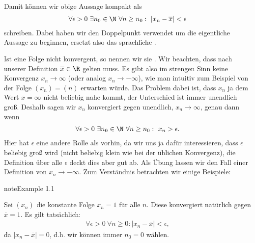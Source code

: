 \documentclass[letterpaper,10pt,english]{jupyterBook}
\begin{document}
Damit können wir obige Aussage kompakt als
\begin{equation*}
\begin{split}\forall \epsilon > 0 ~\exists n_0 \in \N ~\forall n \geq n_0: ~\vert x_n - \overline{x} \vert < \epsilon\end{split}
\end{equation*}
schreiben. Dabei haben wir den Doppelpunkt verwendet um die eigentliche Aussage zu beginnen, \sphinxstyleemphasis{:} ersetzt also das sprachliche .

Ist eine Folge nicht konvergent, so nennen wir sie . Wir beachten, dass nach unserer Definition \(\overline{x} \in \R\) gelten muss. Es gibt also im strengen Sinn keine Konvergenz \(x_n \rightarrow \infty\) (oder analog \(x_n \rightarrow -\infty\)), wie man intuitiv zum Beispiel von der Folge \((x_n) = (n)\) erwarten würde. Das Problem dabei ist, dass \(x_n\) ja dem Wert \(\overline{x}=\infty\) nicht beliebig nahe kommt, der Unterschied ist immer unendlich groß. Deshalb sagen wir \(x_n\) konvergiert gegen unendlich, \(x_n \rightarrow \infty\), genau dann wenn
\begin{equation*}
\begin{split} \forall \epsilon > 0 ~\exists n_0 \in \N ~\forall n \geq n_0: ~ x_n > \epsilon .\end{split}
\end{equation*}
Hier hat \(\epsilon\) eine andere Rolle als vorhin, da wir uns ja dafür interessieren, dass \(\epsilon\) beliebig groß wird (nicht beliebig klein wie bei der üblichen Konvergenz), die Definition über alle \(\epsilon\) deckt dies aber gut ab. Als Übung lassen wir den Fall einer Definition von \(x_n \rightarrow -  \infty\). Zum Verständnis betrachten wir einige Beispiele:
\label{vorkurs/folgen:example-1}
\begin{sphinxadmonition}{note}{Example 1.1}



Sei \((x_n)\) die konstante Folge \(x_n = 1 \) für alle \(n\). Diese konvergiert natürlich gegen \(\overline{x} = 1\). Es gilt tatsächlich:
\begin{equation*}
\begin{split} \forall \epsilon > 0 ~\forall n \geq 0:  \vert x_n - \overline{x}\vert < \epsilon, \end{split}
\end{equation*}
da \(\vert x_n - \overline{x}\vert =0\), d.h. wir können immer \(n_0=0\) wählen.
\end{sphinxadmonition}
\end{document}
